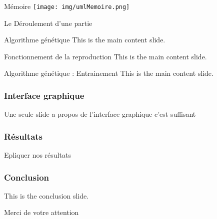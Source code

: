\documentclass{beamer}
\begin{document}
\begin{frame}{Mémoire}
    \texttt{[image: img/umlMemoire.png]}
\end{frame}

\begin{frame}{Le Déroulement d'une partie}
    
\end{frame}

\begin{frame}{Algorithme génétique}
    This is the main content slide.
\end{frame}

\begin{frame}{Fonctionnement de la reproduction}
    This is the main content slide.
\end{frame}

\begin{frame}{Algorithme génétique : Entrainement}
    This is the main content slide.
\end{frame}

\begin{frame}
    \frametitle{Interface graphique}
    Une seule slide a propos de l'interface graphique c'est suffisant
\end{frame}

\begin{frame}
    \frametitle{Résultats}
    Epliquer nos résultats
\end{frame}

\begin{frame}
    \frametitle{Conclusion}
    This is the conclusion slide.
\end{frame}

\begin{frame}{}
    \begin{center}
        \Huge Merci de votre attention
    \end{center}
\end{frame}
\end{document}
